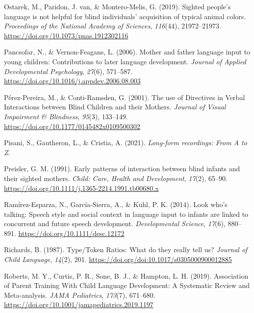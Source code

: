 \documentclass[
  man,floatsintext]{apa6}
\newlength{\cslhangindent}
\newlength{\cslentryspacingunit} %
\newenvironment{CSLReferences}[2] %
 {%
  \setlength{\parindent}{0pt}
  \ifodd #1
  \let\oldpar\par
  \def\par{\hangindent=\cslhangindent\oldpar}
  \fi
  \setlength{\parskip}{#2\cslentryspacingunit}
 }%
 {}
\begin{document}
\begin{CSLReferences}{1}{0}
\leavevmode{}%
Ostarek, M., Paridon, J. van, \& Montero-Melis, G. (2019). Sighted people's language is not helpful for blind individuals' acquisition of typical animal colors. \emph{Proceedings of the National Academy of Sciences}, \emph{116}(44), 21972--21973. \url{https://doi.org/10.1073/pnas.1912302116}

\leavevmode{}%
Pancsofar, N., \& Vernon-Feagans, L. (2006). Mother and father language input to young children: {Contributions} to later language development. \emph{Journal of Applied Developmental Psychology}, \emph{27}(6), 571--587. \url{https://doi.org/10.1016/j.appdev.2006.08.003}

\leavevmode{}%
Pérez-Pereira, M., \& Conti-Ramsden, G. (2001). The use of {Directives} in {Verbal Interactions} between {Blind Children} and their {Mothers}. \emph{Journal of Visual Impairment \& Blindness}, \emph{95}(3), 133--149. \url{https://doi.org/10.1177/0145482x0109500302}

\leavevmode{}%
Pisani, S., Gautheron, L., \& Cristia, A. (2021). \emph{Long-form recordings: {From A} to {Z}}.

\leavevmode{}%
Preisler, G. M. (1991). Early patterns of interaction between blind infants and their sighted mothers. \emph{Child: Care, Health and Development}, \emph{17}(2), 65--90. \url{https://doi.org/10.1111/j.1365-2214.1991.tb00680.x}

\leavevmode{}%
Ramírez-Esparza, N., García-Sierra, A., \& Kuhl, P. K. (2014). Look who's talking: Speech style and social context in language input to infants are linked to concurrent and future speech development. \emph{Developmental Science}, \emph{17}(6), 880--891. \url{https://doi.org/10.1111/desc.12172}

\leavevmode{}%
Richards, B. (1987). Type/{Token Ratios}: What do they really tell us? \emph{Journal of Child Language}, \emph{14}(2), 201. \url{https://doi.org/doi:10.1017/s0305000900012885}

\leavevmode{}%
Roberts, M. Y., Curtis, P. R., Sone, B. J., \& Hampton, L. H. (2019). Association of {Parent Training With Child Language Development}: {A Systematic Review} and {Meta-analysis}. \emph{JAMA Pediatrics}, \emph{173}(7), 671--680. \url{https://doi.org/10.1001/jamapediatrics.2019.1197}


\end{CSLReferences}
\end{document}
